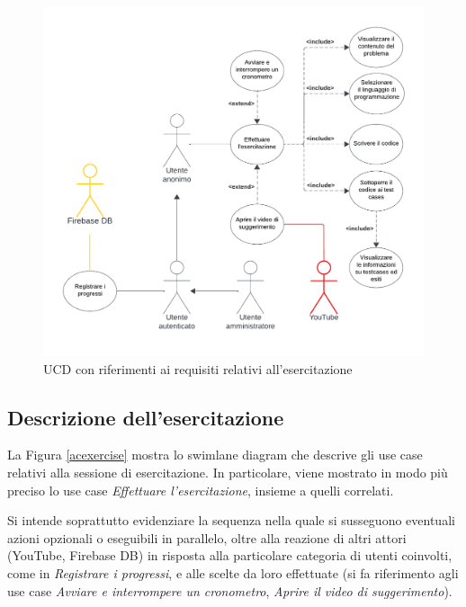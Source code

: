 \documentclass[11pt, a4paper]{article}
\theoremstyle{definition} %
\begin{document}
\begin{figure}[H]
\centering
\hspace*{-1.8cm}
\includegraphics[scale=0.9]{materiale/ucdiagrams/ucesercitazione.pdf}
\caption{UCD con riferimenti ai requisiti relativi all'esercitazione}
\end{figure}

\subsection*{Descrizione dell'esercitazione}
La Figura \ref{acexercise} mostra lo swimlane diagram che descrive gli
use case relativi alla sessione di esercitazione. In particolare,
viene mostrato in modo più preciso lo use case \textit{Effettuare
l'esercitazione}, insieme a quelli correlati.

Si intende soprattutto evidenziare la sequenza nella quale si
susseguono eventuali azioni opzionali o eseguibili in parallelo,
oltre alla reazione di altri attori (YouTube, Firebase DB) in
risposta alla particolare categoria di utenti coinvolti, come in
\textit{Registrare i progressi}, e alle scelte da loro effettuate
(si fa riferimento agli use case \textit{Avviare e interrompere un
cronometro}, \textit{Aprire il video di suggerimento}).
\end{document}
